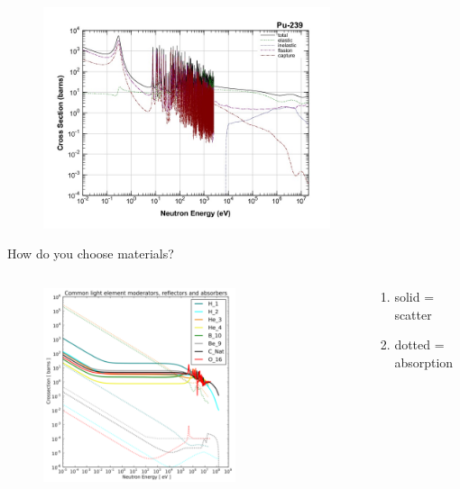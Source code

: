 \documentclass[aspectratio=1610,pdftex,dvipsnames,compress,xcolor={dvipsnames}]{beamer}
\begin{document}
\begin{frame}{}
    \begin{figure}
        \centering
        \includegraphics[width=0.75\textwidth]{pu239.cross.section.jpg}
    \end{figure}
\end{frame}


\begin{frame}{How do you choose materials?}
    \begin{columns}

        \begin{column}{0.75\textwidth}
            \begin{figure}
                \centering
                \includegraphics[width=0.70\textwidth]{moderators.jpg}
            \end{figure}
        \end{column}

        \begin{column}{0.25\textwidth}
            \begin{enumerate}[series=outerlist,topsep=0pt,itemsep=7pt,leftmargin=*,label=(\arabic*)]
                \item[]\small solid = scatter        
                \item[]\small dotted = absorption
            \end{enumerate}
        \end{column}

    \end{columns}
\end{frame}
\end{document}
